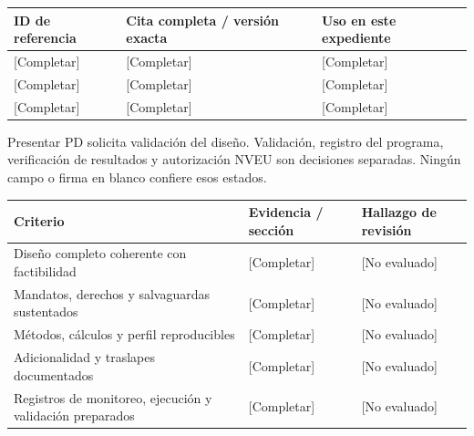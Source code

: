 {\sffamily\fontsize{8.3}{10.3}\selectfont\begin{longtable}{@{}P{29.69mm} P{82.48mm} P{52.79mm}@{}}
\toprule
\textbf{ID de referencia} & \textbf{Cita completa / versión exacta} & \textbf{Uso en este expediente}\\\midrule\endhead
\rule{0pt}{7.7mm}[Completar] & [Completar] & [Completar]\\\hline
\rule{0pt}{7.7mm}[Completar] & [Completar] & [Completar]\\\hline
\rule{0pt}{7.7mm}[Completar] & [Completar] & [Completar]\\\hline
\end{longtable}}
\begin{Notice}Presentar PD solicita validación del diseño. Validación, registro del programa, verificación de resultados y autorización NVEU son decisiones separadas. Ningún campo o firma en blanco confiere esos estados.\end{Notice}
{\sffamily\fontsize{8.3}{10.3}\selectfont\begin{longtable}{@{}P{80.84mm} P{42.89mm} P{41.24mm}@{}}
\toprule
\textbf{Criterio} & \textbf{Evidencia / sección} & \textbf{Hallazgo de revisión}\\\midrule\endhead
\rule{0pt}{7.7mm}Diseño completo coherente con factibilidad & [Completar] & [No evaluado]\\\hline
\rule{0pt}{7.7mm}Mandatos, derechos y salvaguardas sustentados & [Completar] & [No evaluado]\\\hline
\rule{0pt}{7.7mm}Métodos, cálculos y perfil reproducibles & [Completar] & [No evaluado]\\\hline
\rule{0pt}{7.7mm}Adicionalidad y traslapes documentados & [Completar] & [No evaluado]\\\hline
\rule{0pt}{7.7mm}Registros de monitoreo, ejecución y validación preparados & [Completar] & [No evaluado]\\\hline
\end{longtable}}
